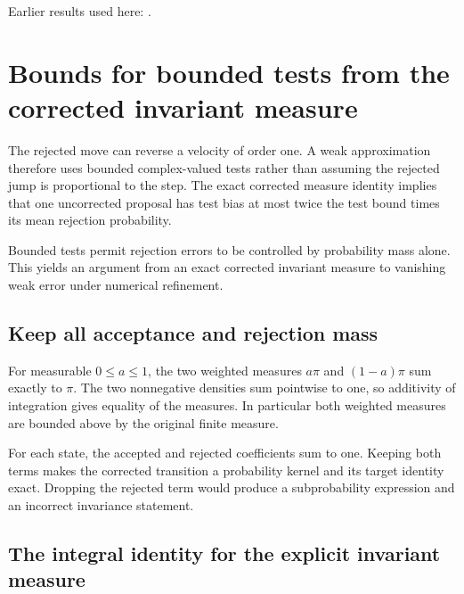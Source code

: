 \documentclass[11pt,a4paper]{report}
\begin{document}
Earlier results used here: \cite[Section~3.35.3]{LangevinLean2026ULASC}.
\section{\texorpdfstring{Bounds for bounded tests from the corrected invariant measure}{Bounds for bounded tests from the corrected invariant measure}}
\label{proof-module-KineticLangevin-HamiltonianTests-lean}


The rejected move can reverse a velocity of order one. A weak approximation therefore uses bounded complex-valued tests rather than assuming the rejected jump is proportional to the step. The exact corrected measure identity implies that one uncorrected proposal has test bias at most twice the test bound times its mean rejection probability.



Bounded tests permit rejection errors to be controlled by probability mass alone. This yields an argument from an exact corrected invariant measure to vanishing weak error under numerical refinement.

\subsection{\texorpdfstring{Keep all acceptance and rejection mass}{Keep all acceptance and rejection mass}}
\label{report-step-KineticLangevin-HamiltonianTests-lean-1}


For measurable \(0\le a\le1\), the two weighted measures \(a\pi\) and \((1-a)\pi\) sum exactly to \(\pi\). The two nonnegative densities sum pointwise to one, so additivity of integration gives equality of the measures. In particular both weighted measures are bounded above by the original finite measure.



For each state, the accepted and rejected coefficients sum to one. Keeping both terms makes the corrected transition a probability kernel and its target identity exact. Dropping the rejected term would produce a subprobability expression and an incorrect invariance statement.

\subsection{\texorpdfstring{The integral identity for the explicit invariant measure}{The integral identity for the explicit invariant measure}}
\label{report-step-KineticLangevin-HamiltonianTests-lean-2}
\end{document}
